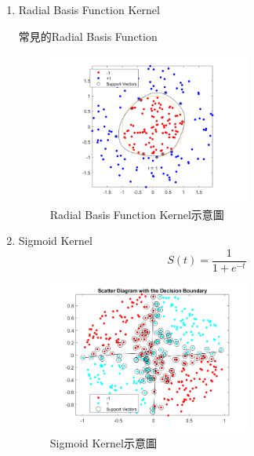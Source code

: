 \begin{enumerate}
	\item
	      Radial Basis Function Kernel
	      \begin{table}[h!]
		      \centering
		      \label{tab:rbf_table}
		      
		      \caption{常見的Radial Basis Function}
	      \end{table}
\begin{figure}[H]
	\centerline{\includegraphics[height=5cm]{pic/Radial Basis Function Kernel.png}}
	\caption{Radial Basis Function Kernel示意圖}
	\label{fig:Radial Basis}
\end{figure}
	\item
	      Sigmoid Kernel
	      \begin{equation}
		      \label{eqn:Sigmoid Kerne}
		      S(t)=\frac{1}{1+e^{-t}}
	      \end{equation}
\begin{figure}[H]
	\centerline{\includegraphics[height=5cm]{pic/Sigmoid Kernel.png}}
	\caption{Sigmoid Kernel示意圖}
	\label{Sigmoid Kernel}
\end{figure}


\end{enumerate}


